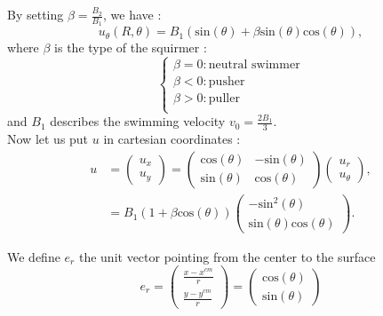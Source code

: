 \documentclass{article}
\begin{document}
By setting $\beta=\frac{B_2}{B_1}$, we have :
$$
u_\theta(R,\theta) = B_1(\mathrm{sin}(\theta) + \beta \mathrm{sin}(\theta)\mathrm{cos}(\theta)),
$$
where $\beta$ is the type of the squirmer :
$$\left\{
    \begin{array}{ll}
        \beta = 0 : \text{neutral swimmer}  \\
        \beta < 0 : \mathrm{pusher} \\
        \beta > 0 : \mathrm{puller} \\
    \end{array}
\right.$$
and $B_1$ describes the swimming velocity $v_0 = \frac{2 B_1}{3}$.
\\ Now let us put $u$ in cartesian coordinates :
\begin{align*}
    u &= \begin{pmatrix}
   u_x \\
   u_y
\end{pmatrix}
= \begin{pmatrix}
   \mathrm{cos}(\theta) & -\mathrm{sin}(\theta) \\
   \mathrm{sin}(\theta) & \mathrm{cos}(\theta)
\end{pmatrix}
\begin{pmatrix}
   u_r \\
   u_\theta
\end{pmatrix}, \\
&= B_1 (1 + \beta \mathrm{cos}(\theta))
\begin{pmatrix}
   -\mathrm{sin}^2(\theta) \\
   \mathrm{sin}(\theta)\mathrm{cos}(\theta)
\end{pmatrix}.
\end{align*}

We define $e_r$ the unit vector pointing from the center to the surface 
$$
e_r = \begin{pmatrix}
   \frac{x - x^{cm}}{r}  \\
   \frac{y - y^{cm}}{r} 
\end{pmatrix} = \begin{pmatrix}
   \mathrm{cos}(\theta) \\
   \mathrm{sin}(\theta)
\end{pmatrix}$$ 
\end{document}
